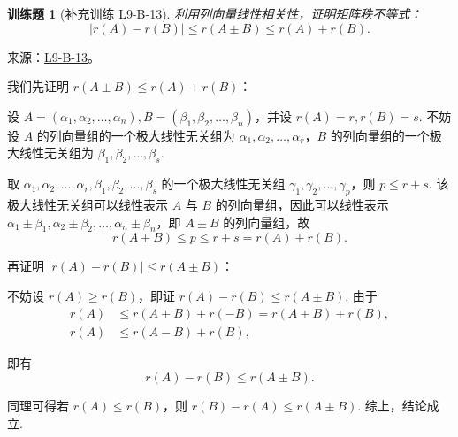 \documentclass[12pt,fontset=fandol]{ctexart}
\newtheorem{exercise}{训练题}[section]
\begin{document}
\begin{exercise}[补充训练 L9-B-13]\label{prob:L9-B-13}
利用列向量线性相关性，证明矩阵秩不等式：\[|r(A)-r(B)|\leqslant r(A\pm B) \leqslant r(A)+r(B).\]
\end{exercise}
\noindent 来源：\href{https://github.com/yhwu-is/Linear-Algebra-Left-Undone/blob/new/%E8%AE%B2%E4%B9%89/%E4%B8%93%E9%A2%98/9%20%E7%9F%A9%E9%98%B5%E8%BF%90%E7%AE%97%E8%BF%9B%E9%98%B6.tex}{L9-B-13}。
\begin{solve}
我们先证明 $r(A \pm B) \leqslant r(A)+r(B)$：

            设 $A = (\alpha_1, \alpha_2, \ldots, \alpha_n), B = (\beta_1, \beta_2, \ldots, \beta_n)$，并设 $r(A) = r, r(B) = s$. 不妨设 $A$ 的列向量组的一个极大线性无关组为 $\alpha_1, \alpha_2, \ldots, \alpha_r$，$B$ 的列向量组的一个极大线性无关组为 $\beta_1, \beta_2, \ldots, \beta_s$.

            取 $\alpha_1, \alpha_2, \ldots, \alpha_r, \beta_1, \beta_2, \ldots, \beta_s$ 的一个极大线性无关组 $\gamma_1, \gamma_2, \ldots, \gamma_p$，则 $p \leqslant r+s$. 该极大线性无关组可以线性表示 $A$ 与 $B$ 的列向量组，因此可以线性表示 $\alpha_1 \pm \beta_1, \alpha_2 \pm \beta_2, \ldots, \alpha_n \pm \beta_n$，即 $A \pm B$ 的列向量组，故
            \[
                r(A \pm B) \leqslant p \leqslant r+s = r(A) + r(B).
            \]

            再证明 $|r(A) - r(B)| \leqslant r(A \pm B)$：

            不妨设 $r(A) \geqslant r(B)$，即证 $r(A) - r(B) \leqslant r(A \pm B)$. 由于
            \begin{align*}
                r(A) &\leqslant r(A + B) + r(-B) = r(A + B) + r(B), \\
                r(A) &\leqslant r(A - B) + r(B),
            \end{align*}

            即有
            \[
                r(A) - r(B) \leqslant r(A \pm B).
            \]

            同理可得若 $r(A) \leqslant r(B)$，则 $r(B) - r(A) \leqslant r(A \pm B)$. 综上，结论成立.
\end{solve}
\end{document}
